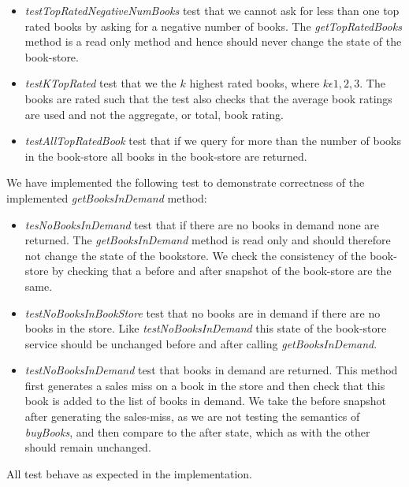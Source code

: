 \documentclass[a4paper]{article}
\begin{document}
\begin{itemize}
\item \textit{testTopRatedNegativeNumBooks} test that we cannot ask for less than one top rated books by asking for  a negative number of books. The \textit{getTopRatedBooks} method is a read only method and hence should never change the state of the book-store.
\item \textit{testKTopRated} test that we the $k$ highest rated books, where \(k\epsilon{1,2,3}\). The books are rated such that the test also checks that the average book ratings are used and not the aggregate, or total, book rating.
\item \textit{testAllTopRatedBook} test that if we query for more than the number of books in the book-store all books in the book-store are returned.
\end{itemize}
We have implemented the following test to demonstrate correctness of the implemented \textit{getBooksInDemand} method:
\begin{itemize}
\item \textit{tesNoBooksInDemand} test that if there are no books in demand none are returned. The \textit{getBooksInDemand} method is read only and should therefore not change the state of the bookstore. We check the consistency of the book-store by checking that a before and after snapshot of the book-store are the same.
\item \textit{testNoBooksInBookStore} test that no books are in demand if there are no books in the store. Like \textit{testNoBooksInDemand} this state of the book-store service should be unchanged before and after calling \textit{getBooksInDemand}.
\item \textit{testNoBooksInDemand} test that books in demand are returned. This method first generates a sales miss on a book in the store and then check that this book is added to the list of books in demand. We take the before snapshot after generating the sales-miss, as we are not testing the semantics of \textit{buyBooks}, and then compare to the after state, which as with the other should remain unchanged.
\end{itemize}
All test behave as expected in the implementation.
\end{document}
